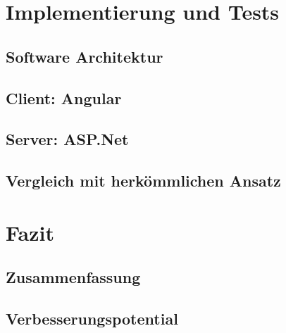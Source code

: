 \documentclass[12pt]{book}          %
\begin{document}
\chapter{Implementierung und Tests}
\label{chap-implementierung-und-tests}

\section{Software Architektur}
\label{sec-impl-architektur}

\section{Client: Angular}
\label{sec-impl-angular}

\section{Server: ASP.Net}
\label{sec-impl-asp-net}

\section{Vergleich mit herkömmlichen Ansatz}
\label{sec-impl-vergleich-mit-herkoemmlichen-ansatz}

\chapter{Fazit}
\label{chap-fazit}

\section{Zusammenfassung}
\label{sec-fazit-zusammenfassung}

\section{Verbesserungspotential}
\label{sec-fazit-verbesserungsprotential}

\printbibliography
\end{document}
